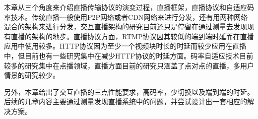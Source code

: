 本章从三个角度来介绍直播传输协议的演变过程，直播框架，直播协议和自适应码率技术。传统直播一般使用P2P网络或者CDN网络来进行分发，还有用两种网络混合的架构来进行分发，交互直播架构的研究目前还只是停留在通过测量去发现现有直播的架构的地步。直播协议方面，RTMP协议因其较低的端到端时延而在直播应用中使用较多。HTTP协议因为至少一个视频块时长的时延而较少应用在直播中，但目前也有一些研究集中在减少HTTP协议的时延方面。码率自适应技术目前较多的研究集中在点播领域，直播方面目前的研究只涵盖了点对点的直播，多用户情景的研究较少。

另外，本章给出了交互直播的三点性能要求，高码率，少切换以及端到端的时延。后续的几章内容主要通过测量发现直播系统中的问题，并尝试设计出一套相应的解决方案。
